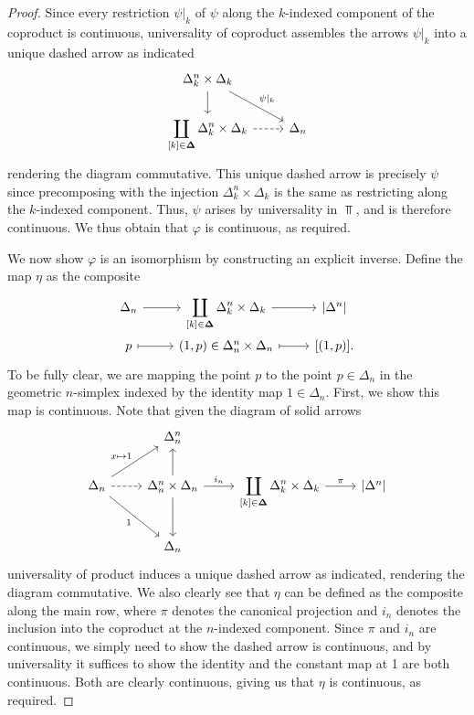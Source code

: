 \begin{proof}
    Since every restriction $\psi|_k$ of $\psi$ along the $k$-indexed component of the coproduct is continuous, universality of coproduct assembles the arrows $\psi|_k$ into a unique dashed arrow as indicated
    \[\begin{tikzcd}
	{\Delta_k^n\times\Delta_k} \\
	{\displaystyle{\coprod_{[k]\in\BD}\Delta_k^n\times\Delta_k}} & {\Delta_n}
	\arrow[from=1-1, to=2-1]
	\arrow["{\psi|_k}", from=1-1, to=2-2]
	\arrow[dashed, from=2-1, to=2-2]
    \end{tikzcd}\]
    rendering the diagram commutative. This unique dashed arrow is precisely $\psi$ since precomposing with the injection $\Delta_k^n\times\Delta_k$ is the same as restricting along the $k$-indexed component. Thus, $\psi$ arises by universality in $\Top$, and is therefore continuous. We thus obtain that $\varphi$ is continuous, as required.

    We now show $\varphi$ is an isomorphism by constructing an explicit inverse. Define the map $\eta$ as the composite
    \[\begin{tikzcd}[row sep=0em]
	{\Delta_n} & {\displaystyle{\coprod_{[k]\in\BD}\Delta_k^n\times\Delta_k}} & {\left|\Delta^n\right|} \\
	p & {(1,p)\in\Delta_n^n\times\Delta_n} & {[(1,p)].}
	\arrow[from=1-1, to=1-2]
	\arrow[from=1-2, to=1-3]
	\arrow[maps to, from=2-1, to=2-2]
	\arrow[maps to, from=2-2, to=2-3]
    \end{tikzcd}\]
    To be fully clear, we are mapping the point $p$ to the point $p\in\Delta_n$ in the geometric $n$-simplex indexed by the identity map $1\in\Delta_n$. First, we show this map is continuous. Note that given the diagram of solid arrows
    \[\begin{tikzcd}
	& {\Delta_n^n} \\
	{\Delta_n} & {\Delta_n^n\times\Delta_n} & {\displaystyle{\coprod_{[k]\in\BD}\Delta_k^n\times\Delta_k}} & {\left|\Delta^n\right|} \\
	& {\Delta_n}
	\arrow["{x\mapsto1}", from=2-1, to=1-2]
	\arrow[dashed, from=2-1, to=2-2]
	\arrow["1"', from=2-1, to=3-2]
	\arrow[from=2-2, to=1-2]
	\arrow["{i_n}", from=2-2, to=2-3]
	\arrow[from=2-2, to=3-2]
	\arrow["\pi", from=2-3, to=2-4]
    \end{tikzcd}\]
    universality of product induces a unique dashed arrow as indicated, rendering the diagram commutative. We also clearly see that $\eta$ can be defined as the composite along the main row, where $\pi$ denotes the canonical projection and $i_n$ denotes the inclusion into the coproduct at the $n$-indexed component. Since $\pi$ and $i_n$ are continuous, we simply need to show the dashed arrow is continuous, and by universality it suffices to show the identity and the constant map at 1 are both continuous. Both are clearly continuous, giving us that $\eta$ is continuous, as required.
    

\end{proof}
